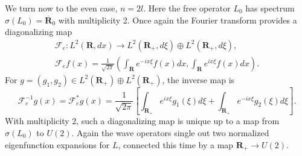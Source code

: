 \documentclass{surv-l}
\theoremstyle{plain}
\theoremstyle{definition}
\numberwithin{equation}{chapter}
\begin{document}
We turn now to the even case, $n=2l$. Here the free operator $L_{0}$ has spectrum $\sigma(L_{0})=\overline{\mathbf{R}}_{0}$ with multiplicity 2. Once again the Fourier transform provides a diagonalizing map
\begin{align}\label{eq36.21}
\mathscr{F}_{e}:L^{2}(\mathbf{R}, dx)\rightarrow L^{2}(\mathbf{R}_{+}, d\xi)\oplus L^{2}(\mathbf{R}_{+}, d\xi),\\
\mathscr{F}_{e}f(x)=\frac{1}{\sqrt{2\pi}}\left(\int_{\mathbf{R}}e^{-ix\xi}f(x)dx,\int_{\mathbf{R}}e^{ix\xi}f(x)dx\right).\nonumber
\end{align}
For $g =(g_{1},g_{2})\in L^{2}(\mathbf{R}_{+})\oplus L^{2}(\mathbf{R}_{+})$, the inverse map is
\begin{equation}\label{eq36.22}
\mathscr{F}_{e}^{-1}g(x) = \mathscr{F}_{e}^{*}g(x)=\frac{1}{\sqrt{2\pi}}\left[\int_{\mathbf{R}_{+}}e^{ix\xi}g_{1}(\xi)d\xi+\int_{\mathbf{R}_{+}}e^{-ix\xi}g_{2}(\xi)d\xi\right].
\end{equation}
With multiplicity 2, such a diagonalizing map is unique up to a map from $\sigma(L_{0})$ to $U(2)$. Again the wave operators single out two normalized eigenfunction expansions for $L$, connected this time by a map $\mathbf{R}_{+}\rightarrow U(2)$.
\setcounter{theorem}{22}
\end{document}
